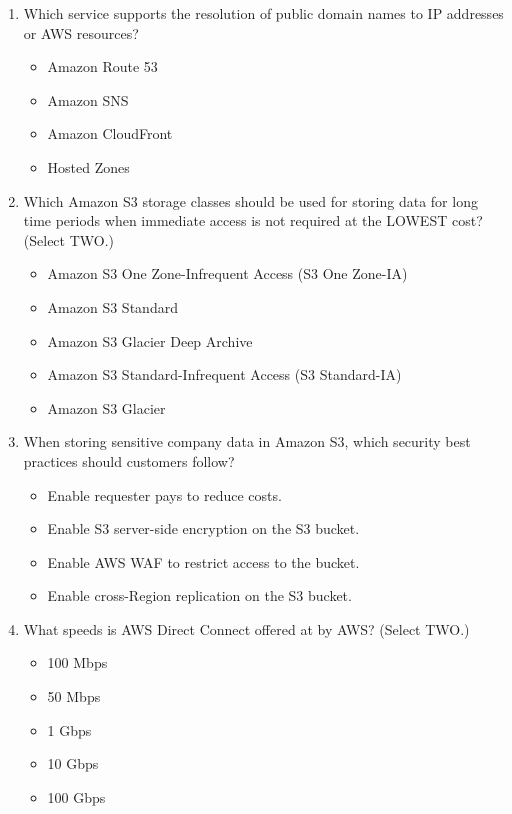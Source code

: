 \begin{enumerate}
	\item Which service supports the resolution of public domain names to IP addresses or AWS resources?
	\begin{itemize}
		\item Amazon Route 53
		\item Amazon SNS
		\item Amazon CloudFront
		\item Hosted Zones
	\end{itemize}

	\item Which Amazon S3 storage classes should be used for storing data for long time periods when immediate access is not required at the LOWEST cost? (Select TWO.)
	\begin{itemize}
		\item Amazon S3 One Zone-Infrequent Access (S3 One Zone-IA)
		\item Amazon S3 Standard
		\item Amazon S3 Glacier Deep Archive
		\item Amazon S3 Standard-Infrequent Access (S3 Standard-IA)
		\item Amazon S3 Glacier
	\end{itemize}

	\item When storing sensitive company data in Amazon S3, which security best practices should customers follow?
	\begin{itemize}
		\item Enable requester pays to reduce costs.
		\item Enable S3 server-side encryption on the S3 bucket.
		\item Enable AWS WAF to restrict access to the bucket.
		\item Enable cross-Region replication on the S3 bucket.
	\end{itemize}

	\item What speeds is AWS Direct Connect offered at by AWS? (Select TWO.)
	\begin{itemize}
		\item 100 Mbps
		\item 50 Mbps
		\item 1 Gbps
		\item 10 Gbps
		\item 100 Gbps
	\end{itemize}


\end{enumerate}
